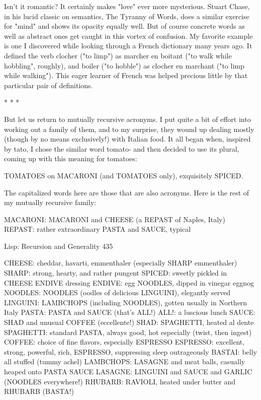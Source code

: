 Isn't it romantic? It certainly makes "love" ever more mysterious. Stuart Chase, in his
lucid classic on semantics, The Tyranny of Words, does a similar exercise for "mind"
and shows its opacity equally well. But of course concrete words as well as abstract
ones get caught in this vortex of confusion. My favorite example is one I discovered
while looking through a French dictionary many years ago. It defined the verb clocher
("to limp") as marcher en boitant ("to walk while hobbling", roughly), and boiler ("to
hobble") as clocher en marchant ("to limp while walking"). This eager learner of
French was helped precious little by that particular pair of definitions.

                                       *   *   *

But let us return to mutually recursive acronyms. I put quite a bit of effort into
working out a family of them, and to my surprise, they wound up dealing mostly
(though by no means exclusively!) with Italian food. It all began when, inspired by
tato, I chose the similar word tomato- and then decided to use its plural, coming up
with this meaning for tomatoes:

TOMATOES on MACARONI (and TOMATOES only), exquisitely SPICED.

The capitalized words here are those that are also acronyms. Here is the rest of my
mutually recursive family:

MACARONI:
    MACARONI and CHEESE (a REPAST of Naples, Italy)
REPAST:
    rather extraordinary PASTA and SAUCE, typical




Lisp: Recursion and Generality                                                       435

CHEESE:
      cheddar, havarti, emmenthaler (especially SHARP
      emmenthaler)
SHARP:
      strong, hearty, and rather pungent
SPICED:
      sweetly pickled in CHEESE ENDIVE dressing
ENDIVE:
      egg NOODLES, dipped in vinegar eggnog
NOODLES:
      NOODLES (oodles of delicious LINGUINI), elegantly served
LINGUINI:
      LAMBCHOPS (including NOODLES), gotten usually in Northern Italy
PASTA:
      PASTA and SAUCE (that's ALL!)
ALL!:
      a luscious lunch
SAUCE:
      SHAD and unusual COFFEE (eccellente!)
SHAD:
      SPAGHETTI, heated al dente
SPAGHETTI:
      standard PASTA, always good, hot especially (twist, then ingest)
COFFEE:
      choice of fine flavors, especially ESPRESSO
ESPRESSO:
      excellent, strong, powerful, rich, ESPRESSO, suppressing sleep
outrageously
BASTAI:
      belly all stuffed (tummy achel)
LAMBCHOPS:
      LASAGNE and meat balls, casually heaped onto PASTA SAUCE
LASAGNE:
      LINGUINI and SAUCE and GARLIC (NOODLES everywhere!)
RHUBARB:
      RAVIOLI, heated under butter and RHUBARB (BASTA!)




